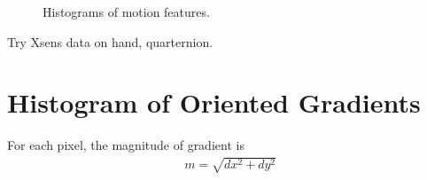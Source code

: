 \begin{figure}[tbh]
\centering
{}
\caption{Histograms of motion features.}
\end{figure}

Try Xsens data on hand, quarternion.

\section{Histogram of Oriented Gradients}
For each pixel, the magnitude of gradient is 
\begin{align*}
m = \sqrt{dx^2 + dy^2}
\end{align*}

